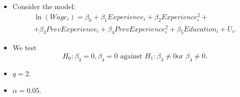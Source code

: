 \documentclass[notes=show,compress,beamer]{beamer}
\begin{document}
\begin{frame}%


\begin{itemize}
\item Consider the model:%
\begin{multline*}
\ln \left( Wage_{i}\right) =\beta _{0}+\beta _{1}Experience_{i}+\beta
_{2}Experience_{i}^{2}+ \\
+\beta _{3}PrevExperience_{i}+\beta _{4}PrevExperience_{i}^{2}+\beta
_{5}Education_{i}+U_{i}.
\end{multline*}

\item We test%
\begin{equation*}
H_{0}:\beta _{3}=0,\beta _{4}=0\text{ against }H_{1}:\beta _{3}\neq 0\text{
or }\beta _{4}\neq 0.
\end{equation*}%
\pause%

\item $q=2.$%
\pause%

\item $\alpha =0.05.$
\end{itemize}

\end{frame}%
\end{document}
